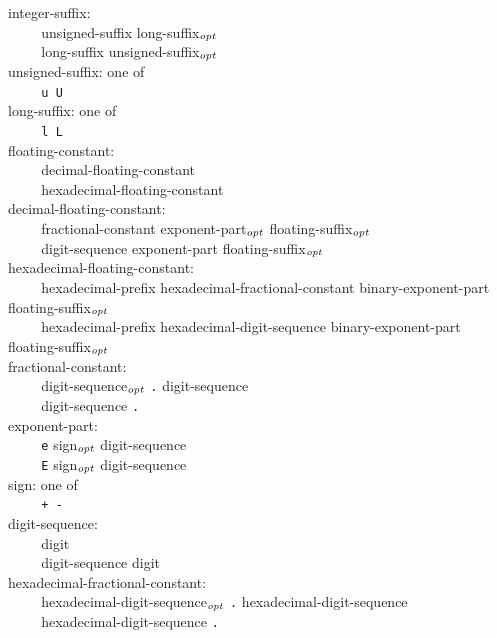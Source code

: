 \documentclass[12pt]{report}
\def\|{\verb|}
\newcommand\opt{$_{{\it opt}}$ }
\begin{document}
\noindent
integer-suffix:\\
\|    | unsigned-suffix long-suffix\opt\\
\|    | long-suffix unsigned-suffix\opt\\

\noindent
unsigned-suffix: {\rm one of}\\
\|    | \verb+u U+\\

\noindent
long-suffix: {\rm one of}\\
\|    | \verb+l L+\\

\noindent
floating-constant:\\
\|    | decimal-floating-constant\\
\|    | hexadecimal-floating-constant\\

\noindent
decimal-floating-constant:\\
\|    | fractional-constant exponent-part\opt floating-suffix\opt\\
\|    | digit-sequence exponent-part floating-suffix\opt\\

\noindent
hexadecimal-floating-constant:\\
\|    | hexadecimal-prefix hexadecimal-fractional-constant binary-exponent-part floating-suffix\opt\\
\|    | hexadecimal-prefix hexadecimal-digit-sequence binary-exponent-part floating-suffix\opt\\

\noindent
fractional-constant:\\
\|    | digit-sequence\opt \verb+.+ digit-sequence\\
\|    | digit-sequence \verb+.+\\

\noindent
exponent-part:\\
\|    | \verb+e+ sign\opt digit-sequence\\
\|    | \verb+E+ sign\opt digit-sequence\\

\noindent
sign: {\rm one of}\\
\|    | \verb|+ -|\\

\noindent
digit-sequence:\\
\|    | digit\\
\|    | digit-sequence digit\\

\noindent
hexadecimal-fractional-constant:\\
\|    | hexadecimal-digit-sequence\opt \verb+.+ hexadecimal-digit-sequence\\
\|    | hexadecimal-digit-sequence \verb+.+\\
\end{document}
